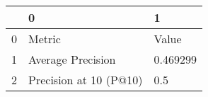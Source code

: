 \begin{tabular}{lll}
\toprule
{} &                       0 &         1 \\
\midrule
0 &                  Metric &     Value \\
1 &       Average Precision &  0.469299 \\
2 &  Precision at 10 (P@10) &       0.5 \\
\bottomrule
\end{tabular}
